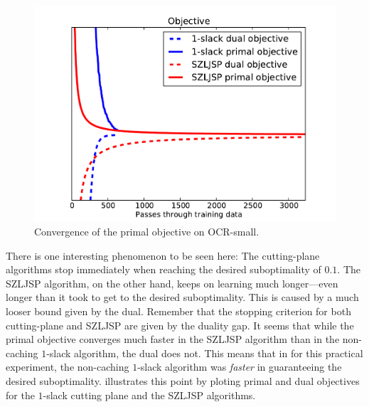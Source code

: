 \begin{figure}
    \begin{center}
    \includegraphics[width=.5\linewidth]{evaluation/images/letters_small_dual}
\end{center}
\caption{%
   Convergence of the primal objective on OCR-small. 
}
\end{figure}

There is one interesting phenomenon to be seen here: The cutting-plane algorithms stop immediately
when reaching the desired suboptimality of $0.1$. The SZLJSP algorithm, on the other hand, keeps
on learning much longer---even longer than it took to get to the desired suboptimality. This is caused
by a much looser bound given by the dual. Remember that the stopping criterion for both cutting-plane 
and SZLJSP are given by the duality gap. It seems that while the primal objective converges much
faster in the SZLJSP algorithm than in the non-caching $1$-slack algorithm, the dual does not.
This means that in for this practical experiment, the non-caching $1$-slack algorithm was \emph{faster}
in guaranteeing the desired suboptimality.
 illustrates this point by ploting primal and dual
objectives for the $1$-slack cutting plane and the SZLJSP algorithms.

